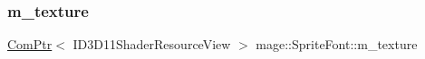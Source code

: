 \hypertarget{classmage_1_1_sprite_font_ad3740a71e8dfeb70e167c33fec855720}{}\label{classmage_1_1_sprite_font_ad3740a71e8dfeb70e167c33fec855720} 
\subsubsection{\texorpdfstring{m\+\_\+texture}{m\_texture}}
{\footnotesize\ttfamily \hyperlink{namespacemage_ae74f374780900893caa5555d1031fd79}{Com\+Ptr}$<$ I\+D3\+D11\+Shader\+Resource\+View $>$ mage\+::\+Sprite\+Font\+::m\+\_\+texture\hspace{0.3cm}{\ttfamily [private]}}

